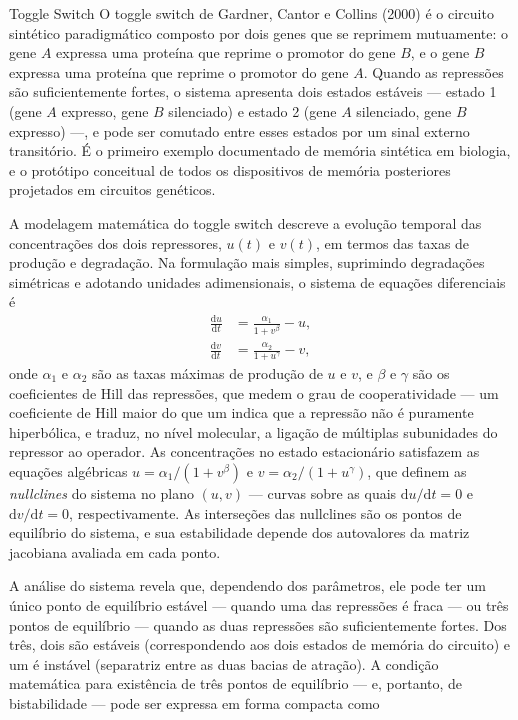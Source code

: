 \begin{definicao}{Toggle Switch}
O toggle switch de Gardner, Cantor e Collins (2000) é o circuito sintético paradigmático composto por dois genes que se reprimem mutuamente: o gene $A$ expressa uma proteína que reprime o promotor do gene $B$, e o gene $B$ expressa uma proteína que reprime o promotor do gene $A$. Quando as repressões são suficientemente fortes, o sistema apresenta dois estados estáveis --- estado 1 (gene $A$ expresso, gene $B$ silenciado) e estado 2 (gene $A$ silenciado, gene $B$ expresso) ---, e pode ser comutado entre esses estados por um sinal externo transitório. É o primeiro exemplo documentado de memória sintética em biologia, e o protótipo conceitual de todos os dispositivos de memória posteriores projetados em circuitos genéticos.
\end{definicao}

A modelagem matemática do toggle switch descreve a evolução temporal das concentrações dos dois repressores, $u(t)$ e $v(t)$, em termos das taxas de produção e degradação. Na formulação mais simples, suprimindo degradações simétricas e adotando unidades adimensionais, o sistema de equações diferenciais é
\begin{align*}
\frac{\mathrm{d}u}{\mathrm{d}t} &= \frac{\alpha_1}{1 + v^{\beta}} - u, \\
\frac{\mathrm{d}v}{\mathrm{d}t} &= \frac{\alpha_2}{1 + u^{\gamma}} - v,
\end{align*}
onde $\alpha_1$ e $\alpha_2$ são as taxas máximas de produção de $u$ e $v$, e $\beta$ e $\gamma$ são os coeficientes de Hill das repressões, que medem o grau de cooperatividade --- um coeficiente de Hill maior do que um indica que a repressão não é puramente hiperbólica, e traduz, no nível molecular, a ligação de múltiplas subunidades do repressor ao operador. As concentrações no estado estacionário satisfazem as equações algébricas $u = \alpha_1/(1+v^\beta)$ e $v = \alpha_2/(1+u^\gamma)$, que definem as \emph{nullclines} do sistema no plano $(u,v)$ --- curvas sobre as quais $\mathrm{d}u/\mathrm{d}t = 0$ e $\mathrm{d}v/\mathrm{d}t = 0$, respectivamente. As interseções das nullclines são os pontos de equilíbrio do sistema, e sua estabilidade depende dos autovalores da matriz jacobiana avaliada em cada ponto.

A análise do sistema revela que, dependendo dos parâmetros, ele pode ter um único ponto de equilíbrio estável --- quando uma das repressões é fraca --- ou três pontos de equilíbrio --- quando as duas repressões são suficientemente fortes. Dos três, dois são estáveis (correspondendo aos dois estados de memória do circuito) e um é instável (separatriz entre as duas bacias de atração). A condição matemática para existência de três pontos de equilíbrio --- e, portanto, de bistabilidade --- pode ser expressa em forma compacta como

